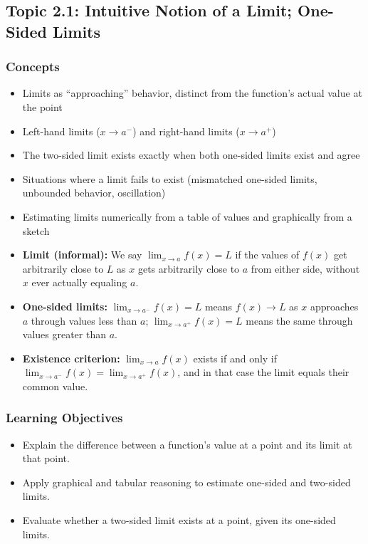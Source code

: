 \documentclass[11pt]{article}
\begin{document}
\subsection{Topic 2.1: Intuitive Notion of a Limit; One-Sided Limits}

\subsubsection*{Concepts}
\begin{itemize}[leftmargin=*]
  \item Limits as ``approaching'' behavior, distinct from the function's actual value at the point
  \item Left-hand limits ($x\to a^-$) and right-hand limits ($x\to a^+$)
  \item The two-sided limit exists exactly when both one-sided limits exist and agree
  \item Situations where a limit fails to exist (mismatched one-sided limits, unbounded behavior, oscillation)
  \item Estimating limits numerically from a table of values and graphically from a sketch
\end{itemize}

\begin{keydefbox}
\begin{itemize}[leftmargin=*]
  \item \textbf{Limit (informal):} We say $\lim_{x\to a} f(x) = L$ if the values of $f(x)$ get arbitrarily close to $L$ as $x$ gets arbitrarily close to $a$ from either side, without $x$ ever actually equaling $a$.
  \item \textbf{One-sided limits:} $\lim_{x\to a^-} f(x)=L$ means $f(x)\to L$ as $x$ approaches $a$ through values less than $a$; $\lim_{x\to a^+} f(x)=L$ means the same through values greater than $a$.
  \item \textbf{Existence criterion:} $\displaystyle\lim_{x\to a} f(x)$ exists if and only if $\displaystyle\lim_{x\to a^-} f(x) = \lim_{x\to a^+} f(x)$, and in that case the limit equals their common value.
\end{itemize}
\end{keydefbox}

\subsubsection*{Learning Objectives}
\begin{itemize}[leftmargin=*]
  \item Explain the difference between a function's value at a point and its limit at that point.
  \item Apply graphical and tabular reasoning to estimate one-sided and two-sided limits.
  \item Evaluate whether a two-sided limit exists at a point, given its one-sided limits.
\end{itemize}
\end{document}
